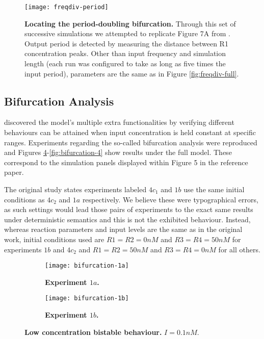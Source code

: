     \begin{figure}[!htb]
      \centering
      \texttt{[image: freqdiv-period]}
      \caption{\textbf{Locating the period-doubling bifurcation.} Through this set of successive simulations we attempted to replicate Figure 7A from \citet{multif}. Output period is detected by measuring the distance between R1 concentration peaks. Other than input frequency and simulation length (each run was configured to take as long as five times the input period), parameters are the same as in Figure \ref{fig:freqdiv-full}.}
      \label{fig:freqdiv-period}
    \end{figure}


  \subsection{Bifurcation Analysis}

    \citet{multif} discovered the model's multiple extra functionalities by verifying different behaviours can be attained when input concentration is held constant at specific ranges.
    Experiments regarding the so-called bifurcation analysis were reproduced and Figures \ref{fig:bifurcation-1}-\ref{fig:bifurcation-4} show results under the full model.
    These correspond to the simulation panels displayed within Figure 5 in the reference paper.

    The original study states experiments labeled $4c_{1}$ and $1b$ use the same initial conditions as $4c_{2}$ and $1a$ respectively.
    We believe these were typographical errors, as such settings would lead those pairs of experiments to the exact same results under deterministic semantics and this is not the exhibited behaviour.
    Instead, whereas reaction parameters and input levels are the same as in the original work, initial conditions used are $R1=R2=0nM$ and $R3=R4=50nM$ for experiments $1b$ and $4c_{2}$ and $R1=R2=50nM$ and $R3=R4=0nM$ for all others.

    \begin{figure}[!htbp]
      \centering
      \begin{subfigure}[t]{0.87\textwidth}
        \centering
        \texttt{[image: bifurcation-1a]}
        \caption{\textbf{Experiment $1a$.}}
        \label{fig:bifurcation-1a}
      \end{subfigure}
      \begin{subfigure}[t]{0.87\textwidth}
        \centering
        \texttt{[image: bifurcation-1b]}
        \caption{\textbf{Experiment $1b$.}}
        \label{fig:bifurcation-1b}
      \end{subfigure}
      \caption{\textbf{Low concentration bistable behaviour.} $I = 0.1 nM$.}
      \label{fig:bifurcation-1}
    \end{figure}

